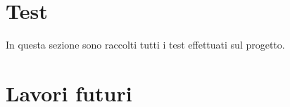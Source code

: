 \section{Test}
In questa sezione sono raccolti tutti i test effettuati sul progetto.

\section{Lavori futuri}